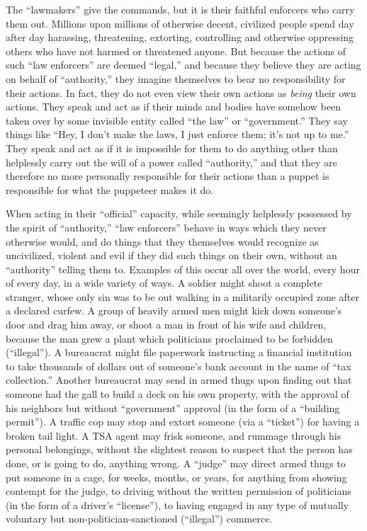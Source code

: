 \documentclass{book}
\begin{document}
The \enquote{lawmakers} give the commands, but it is their faithful enforcers who carry them out. Millions upon millions of otherwise decent, civilized people spend day after day harassing, threatening, extorting, controlling and otherwise oppressing others who have not harmed or threatened anyone. But because the actions of such \enquote{law enforcers} are deemed \enquote{legal,} and because they believe they are acting on behalf of \enquote{authority,} they imagine themselves to bear no responsibility for their actions. In fact, they do not even view their own actions as \emph{being} their own actions. They speak and act as if their minds and bodies have somehow been taken over by some invisible entity called \enquote{the law} or \enquote{government.} They say things like \enquote{Hey, I don't make the laws, I just enforce them; it's not up to me.} They speak and act as if it is impossible for them to do anything other than helplessly carry out the will of a power called \enquote{authority,} and that they are therefore no more personally responsible for their actions than a puppet is responsible for what the puppeteer makes it do.

When acting in their \enquote{official} capacity, while seemingly helplessly possessed by the spirit of \enquote{authority,} \enquote{law enforcers} behave in ways which they never otherwise would, and do things that they themselves would recognize as uncivilized, violent and evil if they did such things on their own, without an \enquote{authority} telling them to. Examples of this occur all over the world, every hour of every day, in a wide variety of ways. A soldier might shoot a complete stranger, whose only sin was to be out walking in a militarily occupied zone after a declared curfew. A group of heavily armed men might kick down someone's door and drag him away, or shoot a man in front of his wife and children, because the man grew a plant which politicians proclaimed to be forbidden (\enquote{illegal}). A bureaucrat might file paperwork instructing a financial institution to take thousands of dollars out of someone's bank account in the name of \enquote{tax collection.} Another bureaucrat may send in armed thugs upon finding out that someone had the gall to build a deck on his own property, with the approval of his neighbors but without \enquote{government} approval (in the form of a \enquote{building permit}). A traffic cop may stop and extort someone (via a \enquote{ticket}) for having a broken tail light. A TSA agent may frisk someone, and rummage through his personal belongings, without the slightest reason to suspect that the person has done, or is going to do, anything wrong. A \enquote{judge} may direct armed thugs to put someone in a cage, for weeks, months, or years, for anything from showing contempt for the judge, to driving without the written permission of politicians (in the form of a driver's \enquote{license}), to having engaged in any type of mutually voluntary but non-politician-sanctioned (\enquote{illegal}) commerce.
\end{document}
